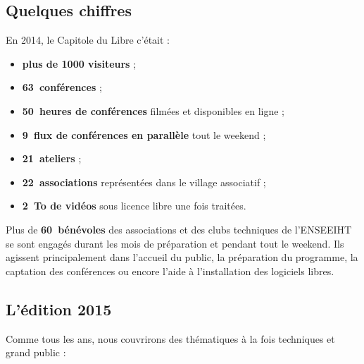 \subsection{Quelques chiffres}

\begin{minipage}{0.6\textwidth}
En 2014, le Capitole du Libre c'était :
\begin{itemize}[label=$\bullet$]
\item \textbf{plus de \num{1000} visiteurs} ;
\item \textbf{63~conférences} ;
\item \textbf{50~heures de conférences} filmées et disponibles en ligne ;
\item \textbf{9~flux de conférences en parallèle} tout le weekend ;
\item \textbf{21~ateliers} ;
\item \textbf{22~associations} représentées dans le village associatif ;
\item \textbf{\SI{2}{\tera o} de vidéos} sous licence libre une fois traitées.
\end{itemize}
\end{minipage}
\begin{minipage}{0.4\textwidth}
\begin{center}
\end{center}
\end{minipage}

\Separateur

Plus de \textbf{60~bénévoles} des associations et des clubs techniques de l’ENSEEIHT se sont engagés durant les mois de préparation et pendant tout le weekend. Ils agissent principalement dans l’accueil du public, la préparation du programme, la captation des conférences ou encore l’aide à l’installation des logiciels libres.	


\subsection{L'édition 2015}

Comme tous les ans, nous couvrirons des thématiques à la fois techniques et grand 
public :

